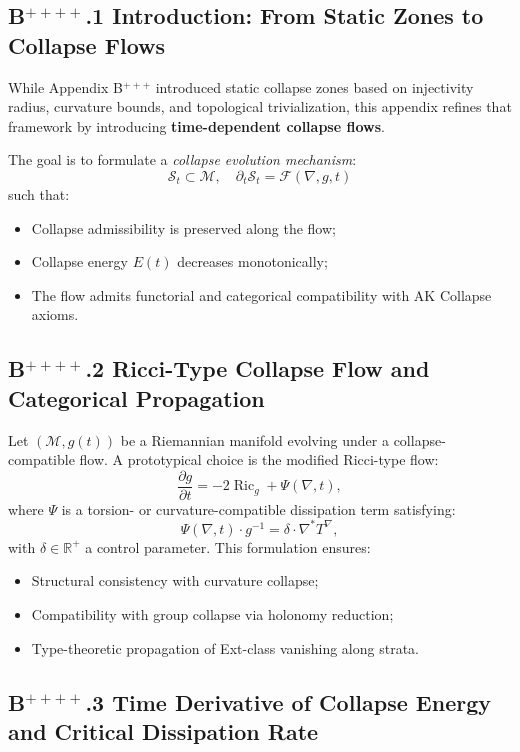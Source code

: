 \documentclass[11pt]{article}
\begin{document}
\subsection*{B$^{++++}$.1 Introduction: From Static Zones to Collapse Flows}

While Appendix B$^{+++}$ introduced static collapse zones based on injectivity radius, curvature bounds, and topological trivialization, this appendix refines that framework by introducing \textbf{time-dependent collapse flows}.

The goal is to formulate a \emph{collapse evolution mechanism}:
\[
\mathcal{S}_t \subset \mathcal{M},\quad \partial_t \mathcal{S}_t = \mathcal{F}(\nabla, g, t)
\]
such that:
\begin{itemize}
  \item Collapse admissibility is preserved along the flow;
  \item Collapse energy \( E(t) \) decreases monotonically;
  \item The flow admits functorial and categorical compatibility with AK Collapse axioms.
\end{itemize}

\subsection*{B$^{++++}$.2 Ricci-Type Collapse Flow and Categorical Propagation}

Let \( (\mathcal{M}, g(t)) \) be a Riemannian manifold evolving under a collapse-compatible flow. A prototypical choice is the modified Ricci-type flow:
\[
\frac{\partial g}{\partial t} = -2 \operatorname{Ric}_g + \Psi(\nabla, t),
\]
where \( \Psi \) is a torsion- or curvature-compatible dissipation term satisfying:
\[
\Psi(\nabla, t) \cdot g^{-1} = \delta \cdot \nabla^\ast T^\nabla,
\]
with \( \delta \in \mathbb{R}^+ \) a control parameter. This formulation ensures:
\begin{itemize}
  \item Structural consistency with curvature collapse;
  \item Compatibility with group collapse via holonomy reduction;
  \item Type-theoretic propagation of Ext-class vanishing along strata.
\end{itemize}

\subsection*{B$^{++++}$.3 Time Derivative of Collapse Energy and Critical Dissipation Rate}
\end{document}
